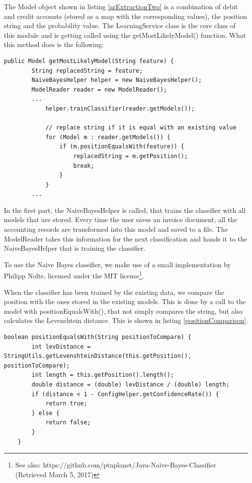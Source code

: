 The Model object shown in listing \ref{arExtractionTwo} is a combination of debit and credit accounts (stored as a map with the corresponding values), the position string and the probability value. The LearningService class is the core class of this module and is getting called using the getMostLikelyModel() function. What this method does is the following:

\begin{lstlisting}[caption={Search for the most likely model}]
 public Model getMostLikelyModel(String feature) {
        String replacedString = feature;
        NaiveBayesHelper helper = new NaiveBayesHelper();
        ModelReader reader = new ModelReader();
        ...
            helper.trainClassifier(reader.getModels());

            // replace string if it is equal with an existing value
            for (Model m : reader.getModels()) {
                if (m.positionEqualsWith(feature)) {
                    replacedString = m.getPosition();
                    break;
                }
            }
		...
\end{lstlisting}

In the first part, the NaiveBayesHelper is called, that trains the classifier with all models that are stored. Every time the user saves an invoice document, all the accounting records are transformed into this model and saved to a file. The ModelReader takes this information for the next classification and hands it to the NaiveBayesHelper that is training the classifier.

To use the Naive Bayes classifier, we make use of a small implementation by Philipp Nolte, licensed under the MIT license\footnote{See also: https://github.com/ptnplanet/Java-Naive-Bayes-Classifier (Retrieved March 5, 2017)}.

When the classifier has been trained by the existing data, we compare the position with the ones stored in the existing models. This is done by a call to the model with positionEqualsWith(), that not simply compares the string, but also calculates the Levenshtein distance. This is shown in listing \ref{positionComparison}.

\begin{lstlisting}[caption={Comparison between positions},label={positionComparison}]
    boolean positionEqualsWith(String positionToCompare) {
        int levDistance = StringUtils.getLevenshteinDistance(this.getPosition(), positionToCompare);
        int length = this.getPosition().length();
        double distance = (double) levDistance / (double) length;
        if (distance < 1 - ConfigHelper.getConfidenceRate()) {
            return true;
        } else {
            return false;
        }
    }
\end{lstlisting}


